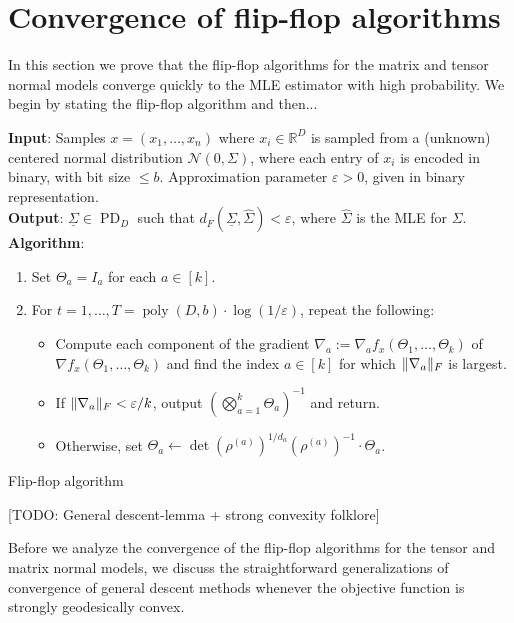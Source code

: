 \documentclass{article}
\DeclareMathOperator{\poly}{poly}
\DeclarePairedDelimiter{\norm}{\lVert}{\rVert}
\newcommand{\R}{{\mathbb{R}}}
\newcommand\eps{\varepsilon}
\newcommand\cN{\mathcal{N}}
\newcommand\PD{\operatorname{PD}}
\newcommand\samp{x}
\newcommand{\TODO}[1]{{\color{blue}[TODO: #1]}}
\begin{document}
\section{Convergence of flip-flop algorithms}

In this section we prove that the flip-flop algorithms for the matrix and tensor normal models converge quickly to the MLE estimator with high probability. We begin by stating the flip-flop algorithm and then... 

\begin{Algorithm}
\textbf{Input}: Samples $\samp = (\samp_1, \ldots, \samp_n)$ where $\samp_i \in \R^D$ is sampled from a (unknown) centered normal distribution $\cN(0, \Sigma)$, where each entry of $\samp_i$ is encoded in binary, with bit size $\le b$. Approximation parameter $\eps > 0$, given in binary representation. \\[.3ex]

\textbf{Output}: $\underline{\Sigma} \in \PD_D$ such that $d_F(\underline{\Sigma}, \hat{\Sigma}) < \eps$, where $\hat{\Sigma}$ is the MLE for $\Sigma$. \\[.3ex]

\textbf{Algorithm}:
\begin{enumerate}
\item\label{it:flip-flop step 1} Set $\Theta_a = I_a$ for each $a \in [k]$.
\item\label{it:flip-flop step 2} For $t=1,\dots,T = \poly(D, b) \cdot \log(1/\eps)$, repeat the following:
\begin{itemize}
\item Compute each component of the gradient $\nabla_a := \nabla_a f_{\samp}(\Theta_1, \ldots, \Theta_k)$ of $\nabla f_{\samp}(\Theta_1, \ldots, \Theta_k)$ and find the index $a \in [k]$ for which $\norm{\nabla_a}_F$ is largest. 
\item
If $\norm{\nabla_a}_F < \eps/k$, output $\left( \bigotimes_{a =1}^k \Theta_a \right)^{-1}$ and return.
\item Otherwise, set $\Theta_a \leftarrow \det(\rho^{(a)})^{1/d_a} (\rho^{(a)})^{-1} \cdot \Theta_a$.
\end{itemize}
\end{enumerate}
\caption{Flip-flop algorithm}\label{alg:flip-flop}
\end{Algorithm}

\TODO{General descent-lemma + strong convexity folklore}

Before we analyze the convergence of the flip-flop algorithms for the tensor and matrix normal models, we discuss the straightforward generalizations of convergence of general descent methods whenever the objective function is strongly geodesically convex.
\end{document}

